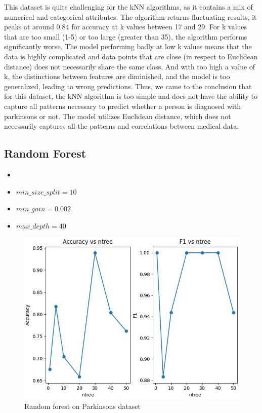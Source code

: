 \documentclass[letterpaper]{article}
\begin{document}
This dataset is quite challenging for the kNN algorithms, as it contains a mix of numerical and categorical attributes. 
The algorithm returns fluctuating results, it peaks at around 0.84 for accuracy at k values between 17 and 29. 
For k values that are too small (1-5) or too large (greater than 35), the algorithm performs significantly worse. 
The model performing badly at low k values means that the data is highly complicated and data points that are close (in respect to Euclidean distance) does not necessarily share the same class. 
And with too high a value of k, the distinctions between features are diminished, and the model is too generalized, leading to wrong predictions. 
Thus, we came to the conclusion that for this dataset, the kNN algorithm is too simple and does not have the ability to capture all patterns necessary to predict whether a person is diagnosed with parkinsons or not. The model utilizes Euclidean distance, which does not necessarily captures all the patterns and correlations between medical data.

\subsection*{Random Forest}
\begin{itemize}
	\item {}
	\item $min\_size\_split = 10$
	\item $min\_gain = 0.002$
	\item $max\_depth = 40$
\end{itemize}

\begin{figure}[H]
	\includegraphics[width=\textwidth]{figures/forest_parkinsons.csv_ig.jpg}
	\caption{Random forest on Parkinsons dataset}
	\label{fig:forest-parkinsons}
\end{figure}
\end{document}
